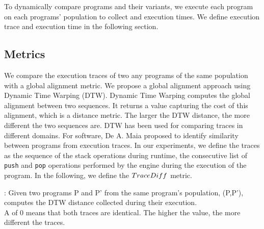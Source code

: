 
To dynamically compare programs and their variants, we execute each program on each programs' population to collect and execution times. We define execution trace and execution time in the following section.

\subsection*{Metrics}
\label{rq2:metrics}

We compare the execution traces of two any programs of the same population with a global alignment metric. We propose a global alignment approach using Dynamic Time Warping (DTW).
Dynamic Time Warping \cite{NEEDLEMAN1970443} computes the global alignment between two sequences. It returns a value capturing the cost of this alignment, which is a distance metric. The larger the DTW distance, the more different the two sequences are.
DTW has been used for comparing traces in different domains. For software, De A. Maia \etal \cite{ Maia08usinga} proposed to identify similarity between programs from execution traces.
In our experiments, we define the traces as the sequence of the stack operations during runtime, \ie the consecutive list of \texttt{push} and \texttt{pop} operations performed by the \wasm engine during the execution of the program.
In the following, we define the $TraceDiff$ metric. 
 



\begin{metric}{\DTW{}:}
\label{metric:stack}
\normalfont 
	Given two programs P and P' from the same program's population, \DTW{}(P,P'), computes the DTW distance collected during their execution. \\
	A \DTW{} of $0$ means that both traces are identical.
	The higher the value, the more different the traces. 
\end{metric}



